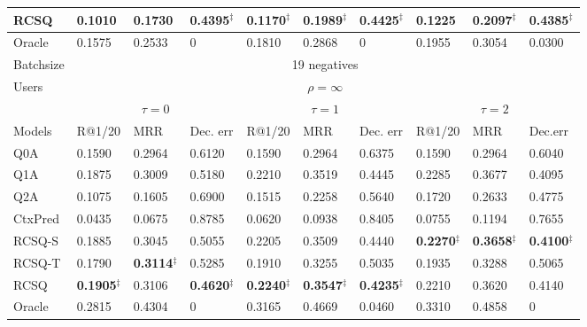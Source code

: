 \documentclass[format=acmsmall, review=False, screen=true]{acmart}
\begin{document}
\begin{table}
{\begin{tabular}{l|l|l|l|l|l|l|l|l|l}
RCSQ     & 0.1010  & 0.1730 &  \textbf{0.4395}$^{\ddag}$ & \textbf{0.1170}$^{\ddag}$ & \textbf{0.1989}$^{\ddag}$ & \textbf{0.4425}$^{\ddag}$ & 0.1225 & \textbf{0.2097}$^{\ddag}$ & \textbf{0.4385}$^{\ddag}$  \\ \hline
Oracle  & 0.1575  & 0.2533  & 0   & 0.1810 & 0.2868 & 0 & 0.1955 & 0.3054 & 0.0300\\ 
\hline\hline
Batchsize & \multicolumn{9}{c}{19 negatives} \\
\hline
\multirow{2}{*}{Users}  & \multicolumn{9}{c}{$\rho=\infty$} \\ 
\cline{2-10}  

&  \multicolumn{3}{c|}{$\tau=0$} & \multicolumn{3}{c|}{$\tau=1$} & \multicolumn{3}{c}{$\tau=2$}\\ \hline
Models  & R@1/20     & MRR    & Dec. err    & R@1/20      & MRR    & Dec. err & R@1/20  & MRR & Dec.err \\ \hline
Q0A     &  0.1590    & 0.2964    & 0.6120  & 0.1590  & 0.2964  & 0.6375 & 0.1590    & 0.2964  & 0.6040 \\ 
Q1A   & 0.1875    &  0.3009  & 0.5180    & 0.2210 & 0.3519 & 0.4445& 0.2285 & 0.3677 & 0.4095 \\ 
Q2A     &  0.1075   & 0.1605    & 0.6900    &  0.1515&  0.2258  & 0.5640 & 0.1720 & 0.2633 & 0.4775   \\
CtxPred &  0.0435   & 0.0675   & 0.8785 & 0.0620& 0.0938 &  0.8405 & 0.0755 & 0.1194 & 0.7655 \\ \hline
RCSQ-S     &0.1885 & 0.3045 & 0.5055 & 0.2205 & 0.3509 & 0.4440 & \textbf{0.2270}$^{\ddag}$ & \textbf{0.3658}$^{\ddag}$ & \textbf{0.4100}$^{\ddag}$ \\ 
RCSQ-T     & 0.1790 & \textbf{0.3114}$^{\ddag}$ & 0.5285 & 0.1910 &0.3255  & 0.5035 &  0.1935 & 0.3288 &  0.5065 \\ 
RCSQ     & \textbf{0.1905}$^{\ddag}$ & 0.3106 & \textbf{0.4620}$^{\ddag}$ & \textbf{0.2240}$^{\ddag}$& \textbf{0.3547}$^{\ddag}$ &  \textbf{0.4235}$^{\ddag}$& 0.2210 & 0.3620 & 0.4140  \\ \hline
Oracle  & 0.2815    & 0.4304       & 0    & 0.3165  & 0.4669 & 0.0460 & 0.3310 & 0.4858 & 0  \\ 
\hline\hline
\end{tabular}
}
\label{openpoly}
\end{table}
\end{document}
